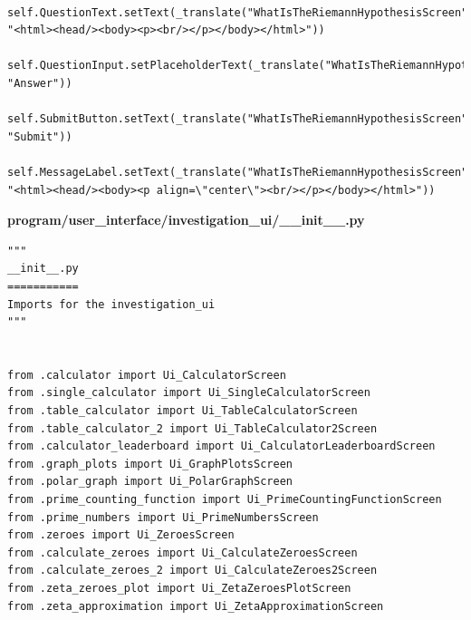 \documentclass[12pt]{article}
\begin{document}
\begin{lstlisting}
        self.QuestionText.setText(_translate("WhatIsTheRiemannHypothesisScreen", "<html><head/><body><p><br/></p></body></html>"))
        self.QuestionInput.setPlaceholderText(_translate("WhatIsTheRiemannHypothesisScreen", "Answer"))
        self.SubmitButton.setText(_translate("WhatIsTheRiemannHypothesisScreen", "Submit"))
        self.MessageLabel.setText(_translate("WhatIsTheRiemannHypothesisScreen", "<html><head/><body><p align=\"center\"><br/></p></body></html>"))
\end{lstlisting}


\textbf{program/user\_interface/investigation\_ui/\_\_init\_\_.py}
\begin{lstlisting}
"""
__init__.py
===========
Imports for the investigation_ui
"""


from .calculator import Ui_CalculatorScreen
from .single_calculator import Ui_SingleCalculatorScreen
from .table_calculator import Ui_TableCalculatorScreen
from .table_calculator_2 import Ui_TableCalculator2Screen
from .calculator_leaderboard import Ui_CalculatorLeaderboardScreen
from .graph_plots import Ui_GraphPlotsScreen
from .polar_graph import Ui_PolarGraphScreen
from .prime_counting_function import Ui_PrimeCountingFunctionScreen
from .prime_numbers import Ui_PrimeNumbersScreen
from .zeroes import Ui_ZeroesScreen
from .calculate_zeroes import Ui_CalculateZeroesScreen
from .calculate_zeroes_2 import Ui_CalculateZeroes2Screen
from .zeta_zeroes_plot import Ui_ZetaZeroesPlotScreen
from .zeta_approximation import Ui_ZetaApproximationScreen
\end{lstlisting}
\end{document}
